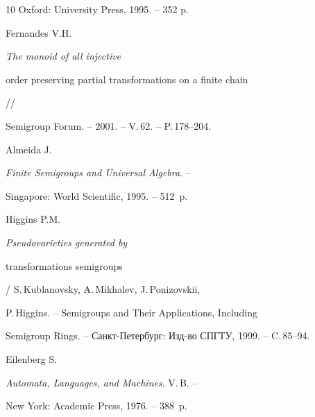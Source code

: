 \begin{thebibliography}{10}
Oxford: University Press, 1995. -- 352 p.







Fernandes V.H.


{\it The monoid of all injective


order preserving partial transformations on a finite chain} //


Semigroup Forum. -- 2001. -- V.\,62. -- P.\,178--204.







Almeida J.


{\it Finite Semigroups and Universal Algebra}. --


Singapore: World Scientific, 1995. -- 512~p.







Higgins P.M.


{\it Pseudovarieties generated by


transformations semigroups} / S.\,Kublanovsky, A.\,Mikhalev, J.\,Ponizovskii,


P.\,Higgins. -- Semigroups and Their Applications, Including


Semigroup Rings. -- Санкт-Петербург: Изд-во СПГТУ, 1999. -- C.\,85--94.







Eilenberg S.


{\it Automata, Languages, and Machines}. V.\,B. --


New York: Academic Press, 1976. -- 388~p.





\end{thebibliography}





\vskip 2cm












\label{end}



































